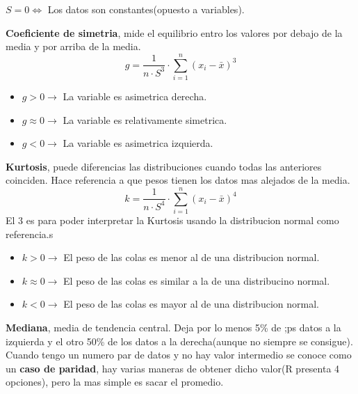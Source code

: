 \begin{property}
$S=0 \Leftrightarrow $ Los datos son constantes(opuesto a variables).
\end{property}

\begin{definition}
	\textbf{Coeficiente de simetria}, mide el equilibrio entro los valores por debajo de la media y por arriba de la media.
	\[
		g = \frac{1}{n \cdot S^3} \cdot \sum_{i=1}^n (x_i - \bar{x})^3
	\]

	\begin{itemize}
		\item $g > 0 \rightarrow$ La variable es asimetrica derecha. 
		\item $g \approx 0 \rightarrow$ La variable es relativamente simetrica.
		\item $g < 0 \rightarrow$ La variable es asimetrica izquierda.  
	\end{itemize}

\end{definition}

\begin{definition}
	\textbf{Kurtosis}, puede diferencias las distribuciones cuando todas las anteriores coinciden. Hace referencia a que pesos tienen los datos mas alejados de la media.
	\[
		k = \frac{1}{n \cdot S^4} \cdot \sum_{i=1}^n (x_i - \bar{x})^4
	\]
El 3 es para poder interpretar la Kurtosis usando la distribucion normal como referencia.s
	\begin{itemize}
		\item $k > 0 \rightarrow$ El peso de las colas es menor al de una distribucion normal. 
		\item $k \approx 0 \rightarrow$ El peso de las colas es similar a la de una distribucino normal. 
		\item $k < 0 \rightarrow$ El peso de las colas es mayor al de una distribucion normal. 
	\end{itemize}
\end{definition}

\begin{definition}
	\textbf{Mediana}, media de tendencia central. Deja por lo menos 5\% de ;ps datos a la izquierda y el otro 50\% de los datos a la derecha(aunque no siempre se consigue). Cuando tengo un numero par de datos y no hay valor intermedio se conoce como un \textbf{caso de paridad}, hay varias maneras de obtener dicho valor(R presenta 4 opciones), pero la mas simple es sacar el promedio. 
\end{definition}

